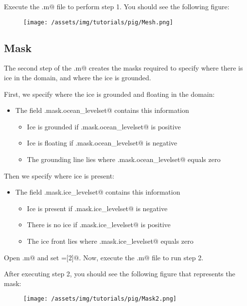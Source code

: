 Execute the \verb@runme.m@ file to perform step 1. You should see the following figure:
\begin{figure}[H]
	\begin{center}
	\texttt{[image: /assets/img/tutorials/pig/Mesh.png]}
	\end{center}
\end{figure}
\subsection{Mask}%
The second step of the \verb@runme.m@ creates the masks required to specify where there is ice in the domain, and where the ice is grounded.

First, we specify where the ice is grounded and floating in the domain:
\begin{itemize}
	\item The field \verb@md.mask.ocean_levelset@ contains this information
		\begin{itemize}
			\item Ice is grounded if \verb@md.mask.ocean_levelset@ is positive
			\item Ice is floating if \verb@md.mask.ocean_levelset@ is negative
			\item The grounding line lies where \verb@md.mask.ocean_levelset@ equals zero
		\end{itemize}
\end{itemize}

Then we specify where ice is present:
\begin{itemize}
	\item The field \verb@md.mask.ice_levelset@ contains this information
		\begin{itemize}
			\item Ice is present if \verb@md.mask.ice_levelset@ is negative
			\item There is no ice if \verb@md.mask.ice_levelset@ is positive
			\item The ice front lies where \verb@md.mask.ice_levelset@ equals zero
		\end{itemize}
\end{itemize}

Open \verb@runme.m@ and set \verb@steps=[2]@. Now, execute the \verb@runme.m@ file to run step 2.

After executing step 2, you should see the following figure that represents the mask:
\begin{figure}[H]
	\begin{center}
		\texttt{[image: /assets/img/tutorials/pig/Mask2.png]}
	\end{center}
\end{figure}
